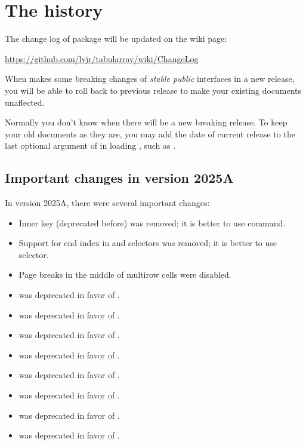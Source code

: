 \documentclass[oneside]{book}
\renewcommand\emph[1]{\textit{\color{red3}#1}}
\begin{document}
{\section{The history}

The change log of  package will be updated on the wiki page:\newline
\centerline{\url{https://github.com/lvjr/tabularray/wiki/ChangeLog}}

When  makes some breaking changes of \emph{stable public} interfaces in a new release,
you will be able to roll back to previous release to make your existing documents unaffected.

Normally you don't know when there will be a new breaking release.
To keep your old documents as they are, you may add the date of current release
to the last optional argument of \CC{\usepackage} in loading ,
such as \CC{\usepackage{tabularray}[=2024-02-16]}.

\subsection{Important changes in version 2025A}

In version 2025A, there were several important changes:

\begin{itemize}[nosep]
  \item Inner key  (deprecated before) was removed;
        it is better to use \CC{\fakeverb} command.
  \item Support for end index in  and  selectors was removed;
        it is better to use  selector.
  \item Page breaks in the middle of multirow cells were disabled.%
  \item \CC{\DefTblrTemplate} was deprecated in favor of \CC{\DeclareTblrTemplate}.
  \item \CC{\NewColumnType} was deprecated in favor of \CC{\NewTblrColumnType}.
  \item \CC{\NewRowType} was deprecated in favor of \CC{\NewTblrRowType}.
  \item \CC{\NewColumnRowType} was deprecated in favor of \CC{\NewTblrColumnRowType}.
  \item \CC{\NewDashStyle} was deprecated in favor of \CC{\NewTblrDashStyle}.
  \item \CC{\NewChildSelector} was deprecated in favor of \CC{\NewTblrChildSelector}.
  \item \CC{\NewTableCommand} was deprecated in favor of \CC{\NewTblrTableCommand}.
  \item \CC{\tablewidth} was deprecated in favor of \CC{\lTblrTableWidthDim}.
\end{itemize}

}
\end{document}
